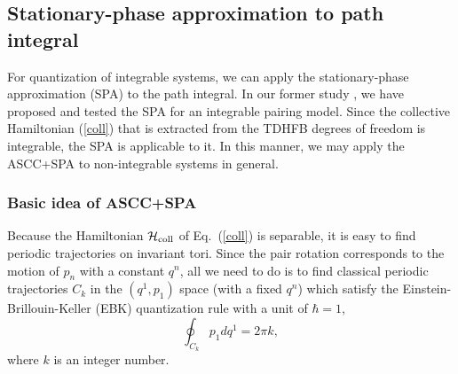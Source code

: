 \documentclass[%
superscriptaddress,
showpacs,
nofootinbib,
amsmath,amssymb,
aps,
prc,
twocolumn,
floatfix ]%
{revtex4-1}
\begin{document}


\subsection{Stationary-phase approximation to path integral}
\label{sec:SPA}

For quantization of integrable systems,
we can apply the stationary-phase approximation (SPA)
to the path integral.
In our former study \cite{NN18},
we have proposed and tested the SPA for an integrable pairing model.
Since the collective Hamiltonian (\ref{coll}) that is
extracted from the TDHFB degrees of freedom is integrable,
the SPA is applicable to it.
In this manner, we may apply the ASCC+SPA to
non-integrable systems in general.


\subsubsection{Basic idea of ASCC+SPA}

Because the Hamiltonian $\mathcal{H}_{\rm coll}$ of Eq.~(\ref{coll})
is separable,
it is easy to find periodic trajectories on invariant tori.
Since the pair rotation corresponds to the motion of $p_n$
with a constant $q^n$,
all we need to do is to find classical periodic trajectories $C_k$ in
the $(q^1,p_1)$ space (with a fixed $q^n$) which satisfy
the Einstein-Brillouin-Keller (EBK) quantization rule
with a unit of $\hbar=1$,
\begin{equation}
	\oint_{C_k} p_1dq^1 = 2\pi k ,
	\label{EBK}
\end{equation}
where $k$ is an integer number.
\end{document}

